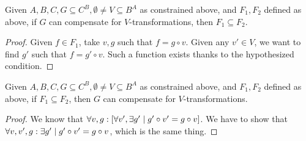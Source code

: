 \documentclass[version=3.21, pagesize, notitlepage, twoside=off, bibliography=totoc, DIV=calc, fontsize=12pt, a4paper]{scrartcl}
\begin{document}
\begin{lemma}
	Given $A, B, C, G \subseteq C^B, \emptyset ≠ V \subseteq B^A$ as constrained above, and $F_1, F_2$ defined as above, if $G$ can compensate for $V$-transformations, then $F_1 \subseteq F_2$.
\end{lemma}
\begin{proof}
	Given $f \in F_1$, take $v, g$ such that $f = g \circ v$. Given any $v' \in V$, we want to find $g'$ such that $f = g' \circ v$. Such a function exists thanks to the hypothesized condition.
\end{proof}

\begin{lemma}
	Given $A, B, C, G \subseteq C^B, \emptyset ≠ V \subseteq B^A$ as constrained above, and $F_1, F_2$ defined as above, if $F_1 \subseteq F_2$, then $G$ can compensate for $V$-transformations.
\end{lemma}
\begin{proof}
	We know that $\forall v, g: [\forall v', \exists g' \suchthat g' \circ v' = g \circ v]$. We have to show that $\forall v, v', g: \exists g' \suchthat g' \circ v' = g \circ v$, which is the same thing.
\end{proof}
\end{document}
